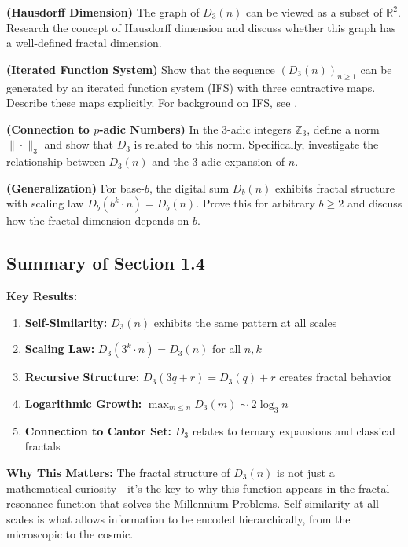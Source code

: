 \begin{exercise}
\textbf{(Hausdorff Dimension)} The graph of $D_3(n)$ can be viewed as a subset of $\mathbb{R}^2$. Research the concept of Hausdorff dimension and discuss whether this graph has a well-defined fractal dimension.
\end{exercise}

\begin{exercise}
\textbf{(Iterated Function System)} Show that the sequence $(D_3(n))_{n \geq 1}$ can be generated by an iterated function system (IFS) with three contractive maps. Describe these maps explicitly. For background on IFS, see \cite{barnsley1988,hutchinson1981}.
\end{exercise}

\begin{exercise}
\textbf{(Connection to $p$-adic Numbers)} In the 3-adic integers $\mathbb{Z}_3$, define a norm $\|\cdot\|_3$ and show that $D_3$ is related to this norm. Specifically, investigate the relationship between $D_3(n)$ and the 3-adic expansion of $n$.
\end{exercise}

\begin{exercise}
\textbf{(Generalization)} For base-$b$, the digital sum $D_b(n)$ exhibits fractal structure with scaling law $D_b(b^k \cdot n) = D_b(n)$. Prove this for arbitrary $b \geq 2$ and discuss how the fractal dimension depends on $b$.
\end{exercise}

\subsection{Summary of Section 1.4}

\textbf{Key Results:}
\begin{enumerate}
\item \textbf{Self-Similarity:} $D_3(n)$ exhibits the same pattern at all scales
\item \textbf{Scaling Law:} $D_3(3^k \cdot n) = D_3(n)$ for all $n, k$
\item \textbf{Recursive Structure:} $D_3(3q + r) = D_3(q) + r$ creates fractal behavior
\item \textbf{Logarithmic Growth:} $\max_{m \leq n} D_3(m) \sim 2\log_3 n$
\item \textbf{Connection to Cantor Set:} $D_3$ relates to ternary expansions and classical fractals
\end{enumerate}

\textbf{Why This Matters:} The fractal structure of $D_3(n)$ is not just a mathematical curiosity—it's the key to why this function appears in the fractal resonance function that solves the Millennium Problems. Self-similarity at all scales is what allows information to be encoded hierarchically, from the microscopic to the cosmic.

